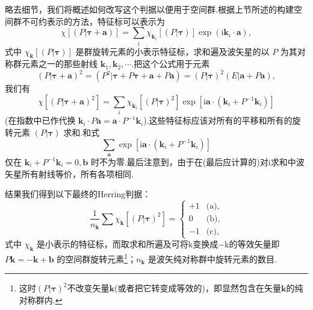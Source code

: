 略去细节，我们将概述如何改写这个判据以便用于空间群.根据上节所述的构建空间群不可约表示的方法，特征标可以表示为
\begin{equation}
  \chi[(P|\boldsymbol{\tau}+\boldsymbol{a})]
  =\sum_i\chi_{\boldsymbol{k}_i}[(P|\boldsymbol{\tau})]
  \exp(\mathrm{i}\boldsymbol{k}_i\cdot\boldsymbol{a}),
\end{equation}
式中 $\chi_{\boldsymbol{k}}[(P|\boldsymbol{\tau})]$ 是群旋转元素的小表示特征标，求和遍及波矢星的以 $P$ 为其对称群元素之一的那些射线 $\boldsymbol{k}_1,\boldsymbol{k}_2,\cdots$.把这个公式用于元素
\begin{equation*}
  (P|\boldsymbol{\tau}+\boldsymbol{a})^2
  =(P^2|\boldsymbol{\tau}+P\boldsymbol{\tau}+\boldsymbol{a}+P\boldsymbol{a})
  =(P|\boldsymbol{\tau})^2(E|\boldsymbol{a}+P\boldsymbol{a}),
\end{equation*}
我们有
\begin{equation*}
  \chi[(P|\boldsymbol{\tau}+\boldsymbol{a})^2]
  =\sum_i\chi_{\boldsymbol{k}_i}[(P|\boldsymbol{\tau})^2]
  \exp[\mathrm{i}\boldsymbol{a}\cdot(\boldsymbol{k}_i+P^{-1}\boldsymbol{k}_i)]
\end{equation*}
(在指数中已作代换 $\boldsymbol{k}_i\cdot P\boldsymbol{a}
=\boldsymbol{a}\cdot P^{-1}\boldsymbol{k}_i$).这些特征标应该对所有的平移和所有的旋转元素 $(P|\boldsymbol{\tau})$ 求和.和式
\begin{equation*}
  \sum_{\boldsymbol{a}}\exp[\mathrm{i}\boldsymbol{a}\cdot(\boldsymbol{k}_i+P^{-1}\boldsymbol{k}_i)]
\end{equation*}
仅在 $\boldsymbol{k}_i+P^{-1}\boldsymbol{k}_i=0,\boldsymbol{b}$ 时不为零.最后注意到，由于在(最后应计算的)对i求和中波矢星所有射线等价，所有各项相同.

结果我们得到以下最终的Herring判据：
\begin{equation}
  \frac{1}{n_{\boldsymbol{k}}}\sum\chi_{\boldsymbol{k}}[(P|\boldsymbol{\tau})^2]=
  \begin{cases}
    +1 & \text{(a)},\\
    0 & \text{(b)},\\
    -1 & \text{(c)},
  \end{cases}
\end{equation}
式中 $\chi_{\boldsymbol{k}}$ 是小表示的特征标，而取求和所遍及可将k变换成−k的等效矢量即 $P\boldsymbol{k}=-\boldsymbol{k}+\boldsymbol{b}$ 的空间群旋转元素\footnote{这时$(P|\boldsymbol{\tau})^2$不改变矢量$\boldsymbol{k}$(或者把它转变成等效的)，即显然包含在矢量$\boldsymbol{k}$的纯对称群内.}；$n_{\boldsymbol{k}}$ 是波矢纯对称群中旋转元素的数目.

